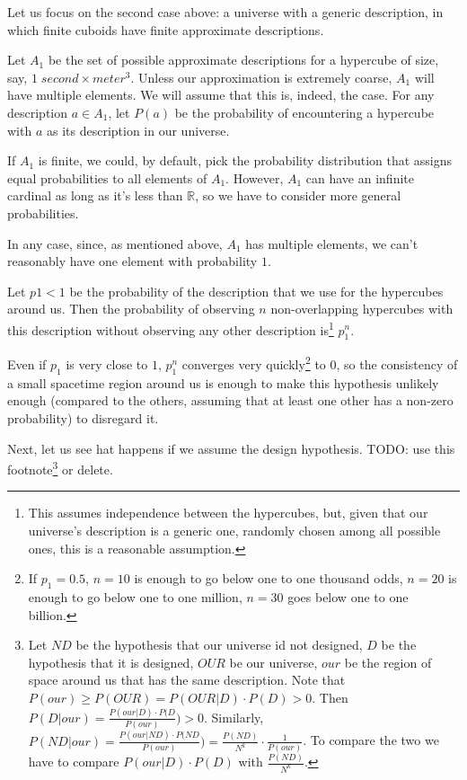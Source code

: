 \documentclass[a4paper
,draft
]{article}
\def\reale{\mathbb{R}}
\begin{document}
Let us focus on the second case above: a universe with a generic
description, in which finite cuboids have finite approximate
descriptions.

Let $A_1$ be the set of possible approximate descriptions for
a hypercube of size, say, $1\;second \times meter^3$.
Unless our approximation is extremely coarse, $A_1$ will have multiple elements.
We will assume that this is, indeed, the case.
For any description $a\in A_1$, let $P(a)$ be the probability of encountering
a hypercube with $a$ as its description in our universe.

If $A_1$ is finite, we could, by default, pick the probability
distribution that assigns equal probabilities to all elements of $A_1$.
However, $A_1$ can have an infinite cardinal as long as it's less than $\reale$,
so we have to consider more general probabilities.

In any case, since, as mentioned above, $A_1$ has multiple elements,
we can't reasonably have one element with probability $1$.

Let $p1<1$ be the probability of the description that we use for the
hypercubes around us.
Then the probability of observing $n$
non-overlapping hypercubes
with this description without observing any other description is\footnote{
  This assumes independence between the hypercubes, but, given that our
  universe's description is a generic one, randomly chosen among all possible
  ones, this is a reasonable assumption.
}
$p_1^n$.

Even if $p_1$ is very close to $1$, $p_1^n$ converges very quickly\footnote{
  If $p_1=0.5$, $n=10$ is enough to go below one to one thousand odds,
  $n=20$ is enough to go below one to one million, $n=30$ goes below one to one
  billion.
  }
to $0$,
so the consistency of a small spacetime region around us is enough
to make this hypothesis unlikely enough (compared to the others, assuming
that at least one other has a non-zero probability) to disregard it.

Next, let us see hat happens if we assume the design hypothesis.
TODO: use this footnote\footnote{
  Let $ND$ be the hypothesis that our universe id not designed,
  $D$ be the hypothesis that it is designed, $OUR$ be our universe,
  $our$ be the region of space around us that has the same description.
  Note that $P(our) \ge P(OUR)=P(OUR|D)\cdot P(D) > 0$.
  Then $P(D|our) = \frac{P(our|D)\cdot P(D}{P(our)}) > 0$.
  Similarly,
  $P(ND|our) = \frac{P(our|ND)\cdot P(ND}{P(our)})
    = \frac{P(ND)}{N^k} \cdot \frac{1}{P(our)}$.
  To compare the two we have to compare
  $P(our|D)\cdot P(D)$ with $\frac{P(ND)}{N^k}$.
  } or delete.
\end{document}
